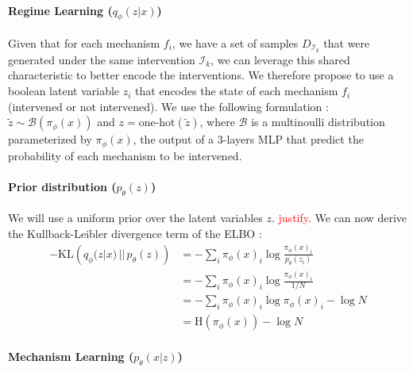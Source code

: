 \documentclass{article}
\newcommand\todo[1]{\textcolor{red}{#1}}
\begin{document}
\paragraph{Regime Learning ($q_\phi(z | x)$)}Given that for each mechanism $f_i$, we have a set of samples $D_{\mathcal{I}_k}$ that were generated under the same intervention $\mathcal{I}_k$, we can leverage this shared characteristic to better encode the interventions. We therefore propose to use a boolean latent variable $z_i$ that encodes the state of each mechanism $f_i$ (intervened or not intervened). We use the following formulation : $\tilde{z} \sim \mathcal{B}(\pi_\phi(x))$ and $z = \text{one-hot}(\tilde{z})$, where $\mathcal{B}$ is a multinoulli distribution parameterized by $\pi_\phi(x)$, the output of a 3-layers MLP that predict the probability of each mechanism to be intervened.
\paragraph{Prior distribution ($p_\theta(z)$)} We will use a uniform prior over the latent variables $z$. \todo{justify}. We can now derive the Kullback-Leibler divergence term of the ELBO :
\begin{align*}
    -\text{KL}\left(q_\phi(z | x) \,||\, p_\theta(z)\right)
    &= - \sum_{i} \pi_\phi(x)_i \log \frac{\pi_\phi(x)_i}{p_\theta(z_i)} \\
    &= - \sum_{i} \pi_\phi(x)_i \log \frac{\pi_\phi(x)_i}{1/N} \\
    &= - \sum_{i} \pi_\phi(x)_i \log \pi_\phi(x)_i - \log N \\
    &= \text{H}(\pi_\phi(x)) - \log N
\end{align*}
\paragraph{Mechanism Learning ($p_\theta(x | z)$)}
\end{document}

